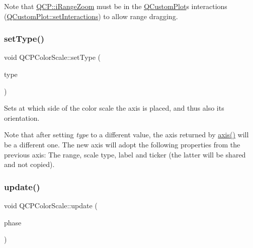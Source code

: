 Note that \mbox{\hyperlink{namespace_q_c_p_a2ad6bb6281c7c2d593d4277b44c2b037abee1e94353525a636aeaf0ba32b72e14}{Q\+C\+P\+::i\+Range\+Zoom}} must be in the \mbox{\hyperlink{class_q_custom_plot}{Q\+Custom\+Plot}}\textquotesingle{}s interactions (\mbox{\hyperlink{class_q_custom_plot_a5ee1e2f6ae27419deca53e75907c27e5}{Q\+Custom\+Plot\+::set\+Interactions}}) to allow range dragging. \mbox{\label{class_q_c_p_color_scale_a1bf9bdb291927c422dd66b404b206f1f}} 
\subsubsection{\texorpdfstring{set\+Type()}{setType()}}
{\footnotesize\ttfamily void Q\+C\+P\+Color\+Scale\+::set\+Type (\begin{DoxyParamCaption}\item[{\mbox{\hyperlink{class_q_c_p_axis_ae2bcc1728b382f10f064612b368bc18a}{Q\+C\+P\+Axis\+::\+Axis\+Type}}}]{type }\end{DoxyParamCaption})}

Sets at which side of the color scale the axis is placed, and thus also its orientation.

Note that after setting {\itshape type} to a different value, the axis returned by \mbox{\hyperlink{class_q_c_p_color_scale_a39bdbdb3b212602a5a57f9f3ea444190}{axis()}} will be a different one. The new axis will adopt the following properties from the previous axis\+: The range, scale type, label and ticker (the latter will be shared and not copied). \mbox{\label{class_q_c_p_color_scale_a259dcb6d3053a2cc3c197e9b1191ddbe}} 
\subsubsection{\texorpdfstring{update()}{update()}}
{\footnotesize\ttfamily void Q\+C\+P\+Color\+Scale\+::update (\begin{DoxyParamCaption}\item[{\mbox{\hyperlink{class_q_c_p_layout_element_a0d83360e05735735aaf6d7983c56374d}{Update\+Phase}}}]{phase }\end{DoxyParamCaption})\hspace{0.3cm}{\ttfamily [virtual]}}

